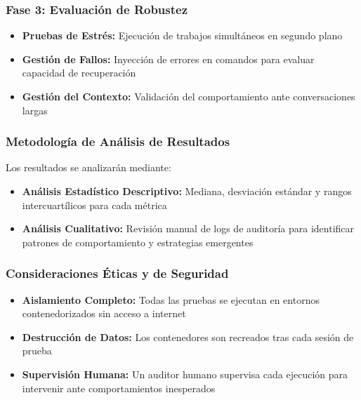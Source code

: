 \subsubsection{Fase 3: Evaluación de Robustez}
\begin{itemize}
    \item \textbf{Pruebas de Estrés:} Ejecución de trabajos simultáneos en segundo plano
    \item \textbf{Gestión de Fallos:} Inyección de errores en comandos para evaluar capacidad de recuperación
    \item \textbf{Gestión del Contexto:} Validación del comportamiento ante conversaciones largas
\end{itemize}

\subsubsection{Metodología de Análisis de Resultados}

Los resultados se analizarán mediante:

\begin{itemize}
    \item \textbf{Análisis Estadístico Descriptivo:} Mediana, desviación estándar y rangos intercuartílicos para cada métrica
    \item \textbf{Análisis Cualitativo:} Revisión manual de logs de auditoría para identificar patrones de comportamiento y estrategias emergentes
\end{itemize}

\subsubsection{Consideraciones Éticas y de Seguridad}

\begin{itemize}
    \item \textbf{Aislamiento Completo:} Todas las pruebas se ejecutan en entornos contenedorizados sin acceso a internet
    \item \textbf{Destrucción de Datos:} Los contenedores son recreados tras cada sesión de prueba
    \item \textbf{Supervisión Humana:} Un auditor humano supervisa cada ejecución para intervenir ante comportamientos inesperados
\end{itemize}
